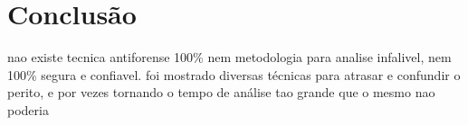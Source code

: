 \chapter{Conclusão}
nao existe tecnica antiforense 100\% nem metodologia para analise infalivel, nem 100\% segura e confiavel. foi mostrado diversas técnicas para atrasar e confundir o perito, e por vezes tornando o tempo de análise tao grande que o mesmo nao poderia 
